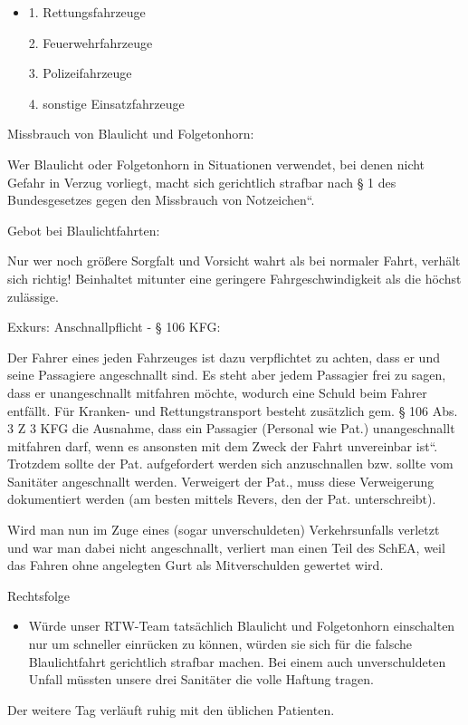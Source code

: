 \documentclass{article}
\begin{document}
\begin{itemize}
\item[] 1. Rettungsfahrzeuge

2. Feuerwehrfahrzeuge

3. Polizeifahrzeuge

4. sonstige Einsatzfahrzeuge

\end{itemize}
Missbrauch von Blaulicht und Folgetonhorn:

Wer Blaulicht oder Folgetonhorn in Situationen verwendet, bei denen
nicht Gefahr in Verzug vorliegt, macht sich gerichtlich strafbar nach
{\S} 1 des {\quotedblbase}Bundesgesetzes gegen den Missbrauch von
Notzeichen{\textquotedblleft}.

Gebot bei Blaulichtfahrten:

Nur wer noch gr\"o{\ss}ere Sorgfalt und Vorsicht wahrt als bei normaler
Fahrt, verh\"alt sich richtig! Beinhaltet mitunter eine geringere
Fahrgeschwindigkeit als die h\"ochst zul\"assige. 

Exkurs: Anschnallpflicht - {\S} 106 KFG:

Der Fahrer eines jeden Fahrzeuges ist dazu verpflichtet zu achten, dass
er und seine Passagiere angeschnallt sind. Es steht aber jedem
Passagier frei zu sagen, dass er unangeschnallt mitfahren m\"ochte,
wodurch eine Schuld beim Fahrer entf\"allt. F\"ur Kranken- und
Rettungstransport besteht zus\"atzlich gem. {\S} 106 Abs. 3 Z 3 KFG die
Ausnahme, dass ein Passagier (Personal wie Pat.) unangeschnallt
mitfahren darf, wenn es ansonsten {\quotedblbase}mit dem Zweck der
Fahrt unvereinbar ist{\textquotedblleft}. Trotzdem sollte der Pat.
aufgefordert werden sich anzuschnallen bzw. sollte vom Sanit\"ater
angeschnallt werden. Verweigert der Pat., muss diese Verweigerung
dokumentiert werden (am besten mittels Revers, den der Pat.
unterschreibt).

Wird man nun im Zuge eines (sogar unverschuldeten) Verkehrsunfalls
verletzt und war man dabei nicht angeschnallt, verliert man einen Teil
des SchEA, weil das Fahren ohne angelegten Gurt als Mitverschulden
gewertet wird.

Rechtsfolge

\begin{itemize}
\item W\"urde unser RTW-Team tats\"achlich Blaulicht und Folgetonhorn
einschalten nur um schneller einr\"ucken zu k\"onnen, w\"urden sie sich
f\"ur die falsche Blaulichtfahrt gerichtlich strafbar machen. Bei einem
auch  unverschuldeten Unfall m\"ussten unsere drei Sanit\"ater die
volle Haftung tragen.

\end{itemize}
Der weitere Tag verl\"auft ruhig mit den \"ublichen Patienten.
\end{document}
